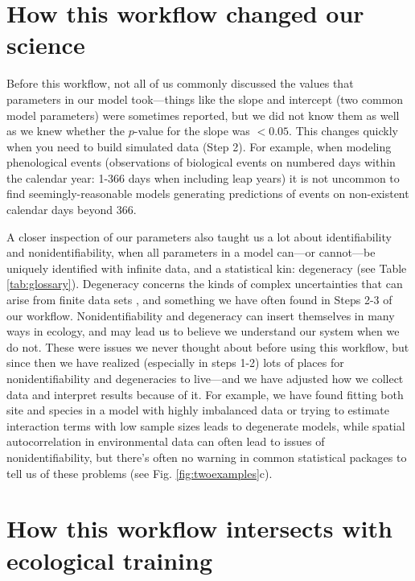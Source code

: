 \documentclass[11pt]{article}
\begin{document}
\section*{How this workflow changed our science} 
Before this workflow, not all of us commonly discussed the values that parameters in our model took---things like the slope and intercept (two common model parameters) were sometimes reported, but we did not know them as well as we knew whether the $p$-value for the slope was $<0.05$. This changes quickly when you need to build simulated data (Step 2). For example, when modeling phenological events (observations of biological events on numbered days within the calendar year: 1-366 days when including leap years) it is not uncommon to find seemingly-reasonable models generating predictions of events on non-existent calendar days beyond 366.

A closer inspection of our parameters also taught us a lot about identifiability and nonidentifiability, when all parameters in a model can---or cannot---be uniquely identified with infinite data, and a statistical kin: degeneracy (see Table \ref{tab:glossary}).  Degeneracy concerns the kinds of complex uncertainties that can arise from finite data sets \citep{gelmanhill}, and something we have often found in Steps 2-3 of our workflow.
Nonidentifiability and degeneracy can insert themselves in many ways in ecology, and may lead us to believe we understand our system when we do not. These were issues we never thought about before using this workflow, but since then we have realized (especially in steps 1-2) lots of places for nonidentifiability and degeneracies to live---and we have adjusted how we collect data and interpret results because of it. For example, we have found fitting both site and species in a model with highly imbalanced data or trying to estimate interaction terms with low sample sizes \citep[for more details see][]{regotherstories} leads to degenerate models, while spatial autocorrelation in environmental data can often lead to issues of nonidentifiability, but there's often no warning in common statistical packages to tell us of these problems (see Fig. \ref{fig:twoexamples}c).

\section*{How this workflow intersects with ecological training} 
\end{document}
